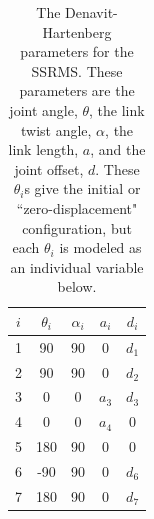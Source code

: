 \documentclass{article}
\begin{document}
\begin{table}[h]
\centering
\begin{tabular}{c|*{4}{c}}
\toprule
$i$ & $\theta_i$ & $\alpha_i$ & $a_i$ & $d_i$ \\
\midrule
1 &  90 & 90 &     0 & $d_1$ \\
2 &  90 & 90 &     0 & $d_2$ \\
3 &   0 &  0 & $a_3$ & $d_3$ \\
4 &   0 &  0 & $a_4$ &     0 \\
5 & 180 & 90 &     0 &     0 \\
6 & -90 & 90 &     0 & $d_6$ \\
7 & 180 & 90 &     0 & $d_7$ \\
\bottomrule
\end{tabular}
\caption{The Denavit-Hartenberg parameters for the SSRMS.
These parameters are the joint angle, $\theta$, the link twist angle, $\alpha$, the link length, $a$, and the joint offset, $d$.
These $\theta_i$s give the initial or ``zero-displacement" configuration, but each $\theta_i$ is modeled as an individual variable below.}
\label{dhparams}
\end{table}
\end{document}
